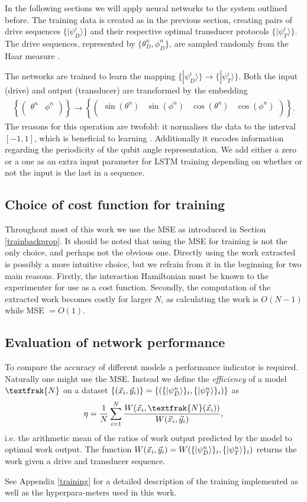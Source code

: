 In the following sections we will apply neural networks to the system outlined before.
The training data is created as in the previous section, creating pairs of drive sequences $\{|\psi_D^i \rangle\}$ and their respective optimal transducer protocols $\{|\psi_T^i \rangle\}$.
The drive sequences, represented by $\{\theta_D^n, \phi_D^n\}$, are sampled randomly from the Haar measure \cite{Mezzadri}.

The networks are trained to learn the mapping $\{|\psi_D^i \rangle\} \to \{|\psi_T^i \rangle\}$.
Both the input (drive) and output (transducer) are transformed by the embedding
\begin{align} \label{embedding}
	\left\{
	\begin{pmatrix}
	\theta^n & \phi^n \\
	\end{pmatrix}
	\right\}
	\to
	\left\{
	\begin{pmatrix}
	\sin(\theta^n) & \sin(\phi^n) & \cos(\theta^n)  & \cos(\phi^n) \\
	\end{pmatrix}
	\right\}.
\end{align}
The reasons for this operation are twofold: it normalises the data to the interval $[-1, 1]$, which is beneficial to learning \cite{LeCun2012}. Additionally it encodes information regarding the periodicity of the qubit angle representation.
We add either a zero or a one as an extra input parameter for LSTM training depending on whether or not the input is the last in a sequence.

\subsection{Choice of cost function for training}
Throughout most of this work we use the MSE as introduced in Section \ref{trainbackprop}.
It should be noted that using the MSE for training is not the only choice, and perhaps not the obvious one.
Directly using the work extracted is possibly a more intuitive choice, but we refrain from it in the beginning for two main reasons.
Firstly, the interaction Hamiltonian must be known to the experimenter for use as a cost function.
Secondly, the computation of the extracted work becomes costly for larger $N$, as calculating the work is $O(N-1)$ while MSE $= O(1)$.

\subsection{Evaluation of network performance}
To compare the accuracy of different models a performance indicator is required. 
Naturally one might use the MSE.
Instead we define the \textit{efficiency} of a model $\textfrak{N}$ on a dataset $\{(\vec{x}_i, \vec{y}_i)\} = \{(\{\ket{\psi_D^n}\}_i, \{\ket{\psi_T^n}\}_i) \}$ as
\begin{align}
	\eta = \frac{1}{N} \sum_{i=1}^N \frac{W(\vec{x}_i,\textfrak{N}(\vec{x}_i))}{W(\vec{x}_i,\vec{y}_i)},
\end{align}
i.e. the arithmetic mean of the ratios of work output predicted by the model to optimal work output.
The function $W(\vec{x}_i, \vec{y}_i) = W(\{\ket{\psi_D^n}\}_i, \{\ket{\psi_T^n}\}_i)$ returns the work given a drive and transducer sequence.

See Appendix \ref{training} for a detailed description of the training implemented as well as the hyperpara-meters used in this work.